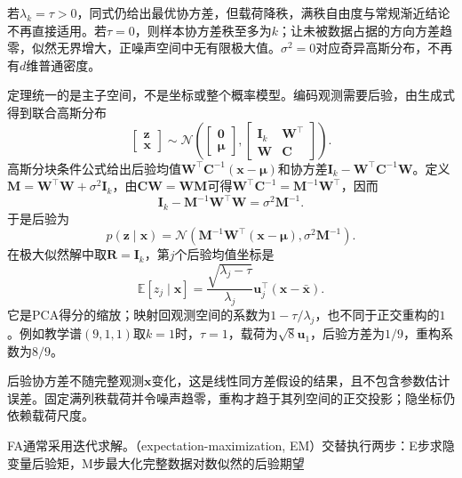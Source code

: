 若$\lambda_k=\tau>0$，同式仍给出最优协方差，但载荷降秩，满秩自由度与常规渐近结论不再直接适用。若$\tau=0$，则样本协方差秩至多为$k$；让未被数据占据的方向方差趋零，似然无界增大，正噪声空间中无有限极大值。$\sigma^2=0$对应奇异高斯分布，不再有$d$维普通密度。

定理统一的是主子空间，不是坐标或整个概率模型。编码观测需要后验，由生成式得到联合高斯分布
\begin{equation}
\label{eq:dim-ppca-joint}
\begin{bmatrix}\bm{z}\\ \bm{x}\end{bmatrix}
\sim\mathcal{N}\left(
\begin{bmatrix}\bm{0}\\ \bm{\mu}\end{bmatrix},
\begin{bmatrix}
\bm{I}_k&\bm{W}^\top\\
\bm{W}&\bm{C}
\end{bmatrix}\right).
\end{equation}
高斯分块条件公式给出后验均值$\bm{W}^\top\bm{C}^{-1}(\bm{x}-\bm{\mu})$和协方差$\bm{I}_k-\bm{W}^\top\bm{C}^{-1}\bm{W}$。定义$\bm{M}=\bm{W}^\top\bm{W}+\sigma^2\bm{I}_k$，由$\bm{C}\bm{W}=\bm{W}\bm{M}$可得$\bm{W}^\top\bm{C}^{-1}=\bm{M}^{-1}\bm{W}^\top$，因而
\[
\bm{I}_k-\bm{M}^{-1}\bm{W}^\top\bm{W}
=\sigma^2\bm{M}^{-1}.
\]
于是后验为
\begin{equation}
\label{eq:dim-ppca-posterior}
p(\bm{z}\mid\bm{x})
=\mathcal{N}\left(
\bm{M}^{-1}\bm{W}^\top(\bm{x}-\bm{\mu}),
\sigma^2\bm{M}^{-1}\right).
\end{equation}
在极大似然解中取$\bm{R}=\bm{I}_k$，第$j$个后验均值坐标是
\begin{equation}
\label{eq:dim-ppca-score}
\mathbb{E}[z_j\mid\bm{x}]
=\frac{\sqrt{\lambda_j-\tau}}{\lambda_j}
\bm{u}_j^\top(\bm{x}-\bar{\bm{x}}).
\end{equation}
它是PCA得分的缩放；映射回观测空间的系数为$1-\tau/\lambda_j$，也不同于正交重构的$1$。例如教学谱$(9,1,1)$取$k=1$时，$\tau=1$，载荷为$\sqrt8\bm{u}_1$，后验方差为$1/9$，重构系数为$8/9$。

后验协方差不随完整观测$\bm{x}$变化，这是线性同方差假设的结果，且不包含参数估计误差。固定满列秩载荷并令噪声趋零，重构才趋于其列空间的正交投影；隐坐标仍依赖载荷尺度。

FA通常采用迭代求解。（expectation-maximization, EM）交替执行两步：E步求隐变量后验矩，M步最大化完整数据对数似然的后验期望

